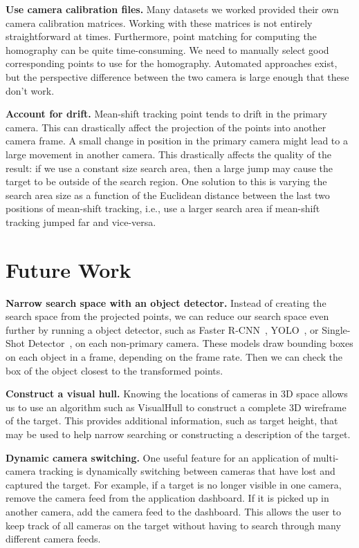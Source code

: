 \documentclass{article}
\begin{document}
\vspace{5pt}
\noindent\textbf{Use camera calibration files.} Many datasets we worked provided their own camera calibration matrices. Working with these matrices is not entirely straightforward at times. Furthermore, point matching for computing the homography can be quite time-consuming. We need to manually select good corresponding points to use for the homography. Automated approaches exist, but the perspective difference between the two camera is large enough that these don't work.

\vspace{5pt}
\noindent\textbf{Account for drift.} Mean-shift tracking point tends to drift in the primary camera. This can drastically affect the projection of the points into another camera frame. A small change in position in the primary camera might lead to a large movement in another camera. This drastically affects the quality of the result: if we use a constant size search area, then a large jump may cause the target to be outside of the search region. One solution to this is varying the search area size as a function of the Euclidean distance between the last two positions of mean-shift tracking, i.e., use a larger search area if mean-shift tracking jumped far and vice-versa.

\section{Future Work}
\label{sec:future}
\vspace{5pt}
\noindent\textbf{Narrow search space with an object detector.} Instead of creating the search space from the projected points, we can reduce our search space even further by running a object detector, such as Faster R-CNN~\cite{ren2015faster}, YOLO~\cite{redmon2016you}, or Single-Shot Detector~\cite{liu2016ssd}, on each non-primary camera. These models draw bounding boxes on each object in a frame, depending on the frame rate. Then we can check the box of the object closest to the transformed points.

\vspace{5pt}
\noindent\textbf{Construct a visual hull.} Knowing the locations of cameras in 3D space allows us to use an algorithm such as VisualHull to construct a complete 3D wireframe of the target. This provides additional information, such as target height, that may be used to help narrow searching or constructing a description of the target.

\vspace{5pt}
\noindent\textbf{Dynamic camera switching.} One useful feature for an application of multi-camera tracking is dynamically switching between cameras that have lost and captured the target. For example, if a target is no longer visible in one camera, remove the camera feed from the application dashboard. If it is picked up in another camera, add the camera feed to the dashboard. This allows the user to keep track of all cameras on the target without having to search through many different camera feeds.



\end{document}
